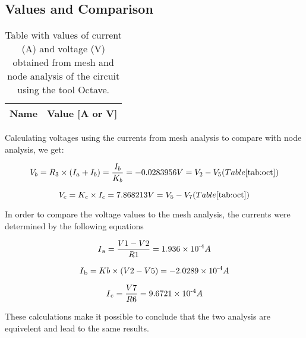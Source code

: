 \subsection{Values and Comparison}

\begin{table}[h]
    \centering
    \begin{tabular}{|l|r|}
      \hline    
      {\bf Name} & {\bf Value [A or V]} \\ \hline
      
    \end{tabular}
    \caption{Table with values of current (A) and voltage (V) obtained from mesh and node analysis of the circuit using the tool Octave.}
    \label{tab:oct}
\end{table}


Calculating voltages using the currents from mesh analysis to compare with node analysis, we get:

\begin{equation}
    V_b = R_3 \times (I_a+I_b) = \frac{I_b}{K_b} = -0.0283956 V = V_2 - V_5 (Table \ref{tab:oct})
\end{equation}

\begin{equation}
    V_c = K_c \times I_c = 7.868213 V = V_5 - V_7 (Table \ref{tab:oct})
\end{equation}


In order to compare the voltage values to the mesh analysis, the currents were determined by the following equations

\begin{equation}
I\textsubscript{a} = \frac{V1 - V2}{R1} = 1.936\times 10\textsuperscript{-4} A
\end{equation}

\begin{equation}
I\textsubscript{b} = Kb \times (V2-V5) = -2.0289\times 10\textsuperscript{-4} A
\end{equation}

\begin{equation}
I\textsubscript{c} = \frac{V7}{R6} = 9.6721 \times 10\textsuperscript{-4} A
\end{equation}

These calculations make it possible to conclude that the two analysis are equivelent and lead to the same results.